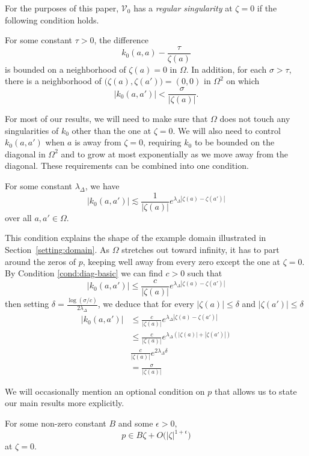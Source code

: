 \documentclass[final]{siamart220329}
\makeatletter
\newcommand{\condconst}[2]{\item[($\text{\textsc{#1}} \mid #2$)]\protected@edef\@currentlabel{$\text{\textsc{#1}} \mid #2$}}
\newcommand{\hardpart}{\mathcal{V}_0}
\newcommand{\hardker}{k_0}
\newcommand{\domain}{\Omega}
\newenvironment{verify}{\color{veriforest}}{\color{black}}
\makeatother
\begin{document}
For the purposes of this paper, $\hardpart$ has a {\em regular singularity} at $\zeta=0$ if the following condition holds.
\begin{conditions}
\condconst{sing}{\tau}\label{cond:sing}For some constant $\tau > 0$, the difference
\[ \hardker(a, a) - \frac{\tau}{\zeta(a)} \]
is bounded on a neighborhood of $\zeta(a) = 0$ in $\domain$.
In addition, for each $\sigma > \tau$, there is a neighborhood of $\big(\zeta(a), \zeta(a')\big) = (0, 0)$ in $\Omega^2$ on which
\[ |\hardker(a, a')| < \frac{\sigma}{|\zeta(a)|}. \]
\end{conditions}
For most of our results, we will need to make sure that $\domain$ does not touch any singularities of $\hardker$ other than the one at $\zeta = 0$. We will also need to control $\hardker(a, a')$ when $a$ is away from $\zeta = 0$, requiring $\hardker$ to be bounded on the diagonal in $\domain^2$ and to grow at most exponentially as we move away from the diagonal. These requirements can be combined into one condition.
\begin{conditions}
\condconst{diag$_0$}{\lambda_\Delta}\label{cond:diag-basic} For some constant $\lambda_\Delta$, we have
\[ |\hardker(a, a')| \lesssim \frac{1}{|\zeta(a)|} e^{\lambda_\Delta|\zeta(a)-\zeta(a')|} \]
over all $a, a' \in \domain$.
\end{conditions}
This condition explains the shape of the example domain illustrated in Section~\ref{setting:domain}. As $\domain$ stretches out toward infinity, it has to part around the zeros of $p$, keeping well away from every zero except the one at $\zeta = 0$.
\begin{verify}
By Condition \eqref{cond:diag-basic} we can find $c>0$ such that \[ | \hardker(a, a') | \le \frac{c}{|\zeta(a)|} e^{\lambda_\Delta|\zeta(a)-\zeta(a')|} \]
then setting $\delta=\frac{\log(\sigma/c)}{2\lambda_\Delta}$, we deduce that for every $|\zeta(a)|\le\delta$ and  $|\zeta(a')|\le\delta$
\begin{align*}
|\hardker(a,a')|&\le \frac{c}{|\zeta(a)|} e^{\lambda_\Delta|\zeta(a)-\zeta(a')|}\\
&\le \frac{c}{|\zeta(a)|} e^{\lambda_\Delta(|\zeta(a)|+|\zeta(a')|)}\\
&\frac{c}{|\zeta(a)|} e^{2\lambda_\Delta \delta}\\
&=\frac{\sigma}{|\zeta(a)|}
\end{align*}
\end{verify}

We will occasionally mention an optional condition on $p$ that allows us to state our main results more explicitly.
\begin{conditions}
\condconst{reg-p}{B, \epsilon}\label{cond:reg-p}
For some non-zero constant $B$ and some $\epsilon > 0$,
\[ p \in B\zeta + O\big(|\zeta|^{1 + \epsilon}\big) \]
at $\zeta = 0$.
\end{conditions}
\end{document}
